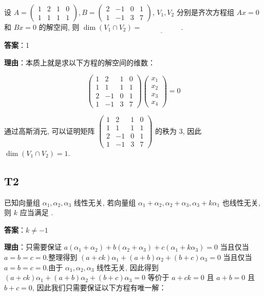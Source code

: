 \documentclass{article}
\begin{document}
\par 设 $A=\begin{pmatrix}
	1 & 2 & 1 & 0\\
	1 & 1 & 1 & 1
\end{pmatrix}, B = \begin{pmatrix}
	2 & -1 & 0 & 1\\
	1 & -1 & 3 & 7
\end{pmatrix}$, $V_1, V_2$ 分别是齐次方程组 $Ax=0$ 和 $Bx=0$ 的解空间, 则 $\dim(V_1\cap V_2)=\underline{\phantom{empty\_space}}$.

\par \textbf{答案}：1

\par \textbf{理由}：本质上就是求以下方程的解空间的维数：

\begin{equation*}
	\begin{pmatrix}
		1 & 2 & 1 & 0\\
		1 & 1 & 1 & 1\\
		2 & -1 & 0 & 1\\
		1 & -1 & 3 & 7
	\end{pmatrix} \begin{pmatrix}
		x_1\\x_2\\x_3\\x_4
	\end{pmatrix}=0
\end{equation*}

\par 通过高斯消元, 可以证明矩阵 $\begin{pmatrix}
	1 & 2 & 1 & 0\\
	1 & 1 & 1 & 1\\
	2 & -1 & 0 & 1\\
	1 & -1 & 3 & 7
\end{pmatrix}$ 的秩为 3, 因此 $\dim(V_1\cap V_2)=1$.

\subsection{T2}

\par 已知向量组 $\alpha_1, \alpha_2, \alpha_3$ 线性无关, 若向量组 $\alpha_1+\alpha_2, \alpha_2+\alpha_3, \alpha_3+k\alpha_1$ 也线性无关, 则 $k$ 应当满足 \underline{\phantom{empty\_space}}.

\par \textbf{答案}：$k\neq -1$

\par \textbf{理由}：只需要保证 $a(\alpha_1+\alpha_2) + b(\alpha_2+\alpha_3)+c(\alpha_1+k\alpha_3)=0$ 当且仅当 $a=b=c=0$.整理得到 $(a+ck)\alpha_1 + (a+b)\alpha_2 + (b+c)\alpha_3=0$ 当且仅当 $a=b=c=0$.由于 $\alpha_1, \alpha_2, \alpha_3$ 线性无关, 因此得到 $(a+ck)\alpha_1 + (a+b)\alpha_2 + (b+c)\alpha_3=0$ 等价于 $a+ck=0$ 且 $a+b=0$ 且 $b+c=0$, 因此我们只需要保证以下方程有唯一解：
\end{document}
